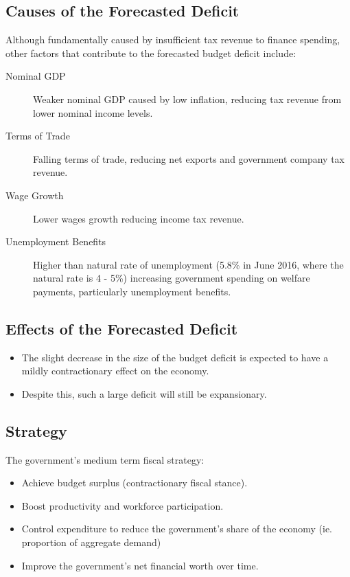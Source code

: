\documentclass[a4paper,11pt]{report}
\begin{document}
\subsection{Causes of the Forecasted Deficit}

Although fundamentally caused by insufficient tax revenue to finance spending,
other factors that contribute to the forecasted budget deficit include:

\begin{description}
\item [Nominal GDP] Weaker nominal GDP caused by low inflation, reducing tax
	revenue from lower nominal income levels.
\item [Terms of Trade] Falling terms of trade, reducing net exports and
	government company tax revenue.
\item [Wage Growth] Lower wages growth reducing income tax revenue.
\item [Unemployment Benefits] Higher than natural rate of unemployment (5.8\%
	in June 2016, where the natural rate is 4 - 5\%) increasing government
	spending on welfare payments, particularly unemployment benefits.
\end{description}

\subsection{Effects of the Forecasted Deficit}

\begin{itemize}
\item The slight decrease in the size of the budget deficit is expected to have
	a mildly contractionary effect on the economy.
\item Despite this, such a large deficit will still be expansionary.
\end{itemize}

\subsection{Strategy}

The government's medium term fiscal strategy:

\begin{itemize}
\item Achieve budget surplus (contractionary fiscal stance).
\item Boost productivity and workforce participation.
\item Control expenditure to reduce the government's share of the economy (ie.
	proportion of aggregate demand)
\item Improve the government's net financial worth over time.
\end{itemize}
\end{document}

